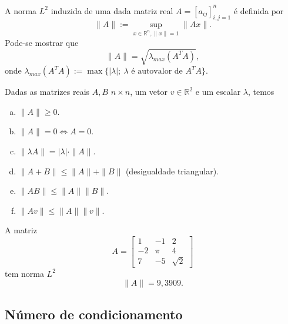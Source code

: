 A norma $L^2$ induzida de uma dada matriz real $A = [a_{ij}]_{i,j=1}^n$ é definida por
\begin{equation}
  \|A\| := \sup_{x\in\mathbb{R}^n, \|x\|=1} \|Ax\|.
\end{equation}
Pode-se mostrar que
\begin{equation}
  \|A\| = \sqrt{\lambda_{max}(A^TA)},
\end{equation}
onde $\lambda_{max}(A^TA) := \max\{|\lambda|;~\lambda\text{ é autovalor de }A^TA\}$.

\begin{prop}
  Dadas as matrizes reais $A, B$ $n\times n$, um vetor $v\in\mathbb{R}^2$ e um escalar $\lambda$, temos
  \begin{enumerate}[a)]
  \item $\|A\| \geq 0$.
  \item $\|A\|=0 \Leftrightarrow A=0$.
  \item $\|\lambda A\| = |\lambda|\cdot \|A\|$.
  \item $\|A+B\| \leq \|A\| + \|B\|$ (desigualdade triangular).
  \item $\|AB\| \leq \|A\|\|B\|$.
  \item $\|Av\| \leq \|A\|\|v\|$.
  \end{enumerate}
\end{prop}

\begin{ex}\label{ex:norma_matriz}
  A matriz
  \begin{equation}
    A =
    \begin{bmatrix}
      1 & -1 & 2\\
      -2 & \pi & 4\\
      7 & -5 & \sqrt{2}
    \end{bmatrix}
  \end{equation}
tem norma $L^2$
\begin{equation}
  \|A\| = 9,3909.
\end{equation}

% 
\end{ex}

\subsection{Número de condicionamento}

